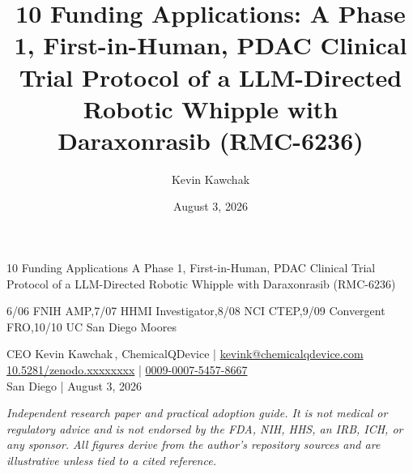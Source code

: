 \documentclass[11pt]{article}
\title{10 Funding Applications: A Phase 1, First-in-Human, PDAC Clinical Trial
Protocol of a LLM-Directed Robotic Whipple with Daraxonrasib (RMC-6236)}
\author{Kevin Kawchak}
\date{August 3, 2026}
\begin{document}
\thispagestyle{plain}

%
{10 Funding Applications}%
{A Phase 1, First-in-Human, PDAC Clinical Trial Protocol of a LLM-Directed
Robotic Whipple with Daraxonrasib (RMC-6236)}

\vspace{0.2em}

\begin{center}
 \enspace {} \enspace
{} \enspace {}
\end{center}

\vspace{-0.35em}

%
{6/{06 FNIH AMP},7/{07 HHMI Investigator},8/{08 NCI CTEP},9/{09 Convergent FRO},10/{10 UC San Diego Moores}}

\vspace{-0.2em}
\apprule{0.9pt}

\begin{center}\small
CEO Kevin Kawchak\,, ChemicalQDevice \;|\;
\href{mailto:kevink@chemicalqdevice.com}{kevink@chemicalqdevice.com}\\
\href{https://doi.org/10.5281/zenodo.xxxxxxxx}{10.5281/zenodo.xxxxxxxx} \;|\;
\href{https://orcid.org/0009-0007-5457-8667}{0009-0007-5457-8667}\\
San Diego \;|\; August 3, 2026
\end{center}

\vspace{-0.3em}
\apprule{0.5pt}

\noindent\footnotesize\textit{Independent research paper and practical adoption
guide. It is not medical or regulatory advice and is not endorsed by the FDA,
NIH, HHS, an IRB, ICH, or any sponsor. All figures derive from the author's
repository sources and are illustrative unless tied to a cited
reference.}\normalsize\par

\vspace{0.15em}
\end{document}
